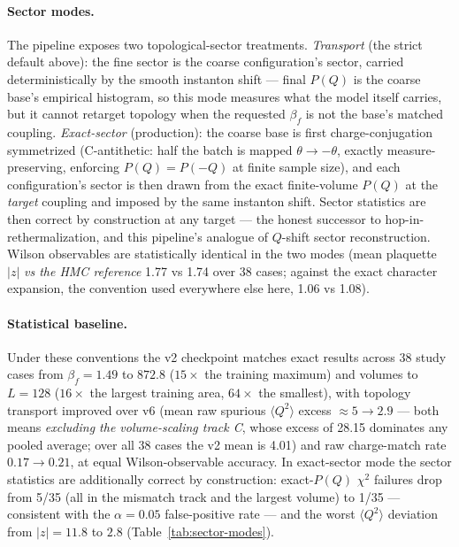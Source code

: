 \paragraph{Sector modes.} The pipeline exposes two topological-sector
treatments. \emph{Transport} (the strict default above): the fine sector is
the coarse configuration's sector, carried deterministically by the smooth
instanton shift --- final $P(Q)$ is the coarse base's empirical histogram,
so this mode measures what the model itself carries, but it cannot retarget
topology when the requested $\beta_f$ is not the base's matched coupling.
\emph{Exact-sector} (production): the coarse base is first
charge-conjugation symmetrized (C-antithetic: half the batch is mapped
$\theta \to -\theta$, exactly measure-preserving, enforcing $P(Q) = P(-Q)$
at finite sample size), and each configuration's sector is then drawn from
the exact finite-volume $P(Q)$ at the \emph{target} coupling and imposed by
the same instanton shift. Sector statistics are then correct by construction
at any target --- the honest successor to hop-in-rethermalization, and this
pipeline's analogue of $Q$-shift sector reconstruction. Wilson observables
are statistically identical in the two modes (mean plaquette $|z|$
\emph{vs the HMC reference} 1.77 vs 1.74 over 38 cases; against the exact
character expansion, the convention used everywhere else here, 1.06 vs
1.08).

\paragraph{Statistical baseline.} Under these conventions the v2 checkpoint
matches exact results across 38 study cases from $\beta_f = 1.49$ to
$872.8$ ($15\times$ the training maximum) and volumes to $L = 128$
($16\times$ the largest training area, $64\times$ the smallest), with
topology transport improved over v6 (mean raw spurious
$\langle Q^2 \rangle$ excess ${\approx}5 \to 2.9$ --- both means
\emph{excluding the volume-scaling track C}, whose excess of 28.15 dominates
any pooled average; over all 38 cases the v2 mean is 4.01) and raw
charge-match rate $0.17 \to 0.21$, at equal Wilson-observable accuracy. In
exact-sector mode the sector statistics are additionally correct by
construction: exact-$P(Q)$ $\chi^2$ failures drop from 5/35 (all in the
mismatch track and the largest volume) to 1/35 --- consistent with the
$\alpha = 0.05$ false-positive rate --- and the worst
$\langle Q^2 \rangle$ deviation from $|z| = 11.8$ to $2.8$
(Table~\ref{tab:sector-modes}).

